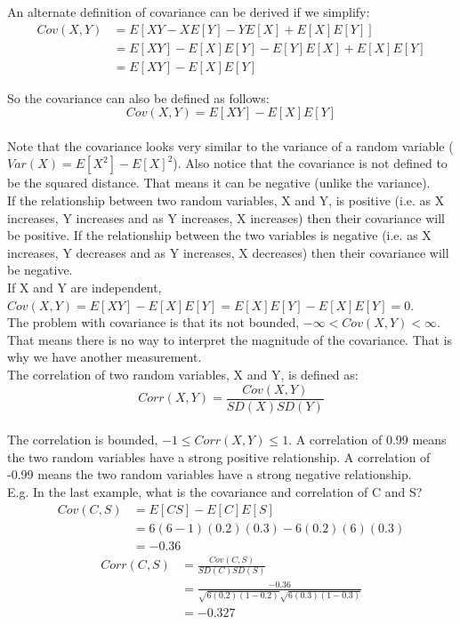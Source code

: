\documentclass[12pt, letterpaper]{article}
\begin{document}
An alternate definition of covariance can be derived if we simplify:
\begin{align*}
Cov\left(X, Y\right) &= E[XY - XE[Y] - YE[X] + E[X]E[Y]]\\
&= E[XY] - E[X]E[Y] - E[Y]E[X] + E[X]E[Y]\\
&= E[XY] - E[X]E[Y]
\end{align*}

So the covariance can also be defined as follows:
\begin{equation}
Cov\left(X, Y\right) = E[XY] - E[X]E[Y]
\end{equation}\\

Note that the covariance looks very similar to the variance of a random variable ($Var\left(X\right) = E[X^2] - E[X]^2$). Also notice that the covariance is not defined to be the squared distance. That means it can be negative (unlike the variance).\\

If the relationship between two random variables, X and Y, is positive (i.e. as X increases, Y increases and as Y increases, X increases) then their covariance will be positive. If the relationship between the two variables is negative (i.e. as X increases, Y decreases and as Y increases, X decreases) then their covariance will be negative.\\

If X and Y are independent, $Cov\left(X, Y\right) = E[XY] - E[X]E[Y] = E[X]E[Y] - E[X]E[Y] = 0$.\\

The problem with covariance is that its not bounded, $-\infty < Cov\left(X, Y\right) < \infty$. That means there is no way to interpret the magnitude of the covariance. That is why we have another measurement.\\

The correlation of two random variables, X and Y, is defined as:
\begin{equation}
Corr\left(X, Y\right) = \frac{Cov\left(X, Y\right)}{SD(X) SD(Y)}
\end{equation}\\

The correlation is bounded, $-1 \leq Corr\left(X, Y\right) \leq 1$. A correlation of 0.99 means the two random variables have a strong positive relationship. A correlation of -0.99 means the two random variables have a strong negative relationship.\\

E.g. In the last example, what is the covariance and correlation of C and S?
\begin{align*}
Cov\left(C, S\right) &= E[CS] - E[C]E[S]\\
&= 6(6 - 1)(0.2)(0.3) - 6(0.2)(6)(0.3)\\
&= -0.36
\end{align*}
\begin{align*}
Corr\left(C, S\right) &= \frac{Cov\left(C, S\right)}{SD(C) SD(S)}\\
&= \frac{-0.36}{\sqrt{6(0.2)(1 - 0.2)} \sqrt{6(0.3)(1 - 0.3)}}\\
&= -0.327
\end{align*}
\end{document}
